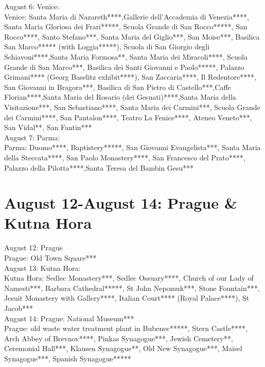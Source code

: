 August 6: Venice:\\

Venice: Santa Maria di Nazareth****,Gallerie dell'Accademia di Venezia****, Santa Maria Gloriosa dei Frari*****, Scuola Grande di San Rocco*****, San Rocco****, Santo Stefano***, Santa Maria del Giglio***, San Moise***, Basilica San Marco***** (with Loggia*****), 
Scuola di San Giorgio degli Schiavoni****,Santa Maria Formosa**, Santa Maria dei Miracoli****, Scuola Grande di San Marco***, Basilica dei Santi Giovanni e Paolo*****, Palazzo Grimani**** (Georg Baselitz exhibit****), San Zaccaria****, Il Redentore****, San Giovanni in Bragora***, 
Basilica di San Pietro di Castello***,Caffe Florian****,Santa Maria del Rosario (dei Gesuati)****,Santa Maria della Visitazione***, San Sebastiano****, Santa Maria dei Carmini***, Scuola Grande dei Carmini****, San Pantalon****, Teatro La Fenice****, Ateneo Veneto***, San Vidal**,
 San Fantin***\\

August 7: Parma:\\

Parma: Duomo****, Baptistery*****, San Giovanni Evangelista***, Santa Maria della Steccata****, San Paolo Monastery****, San Francesco del Prato****, Palazzo della Pilotta****,Santa Teresa del Bambin Gesu***\\

\section{August 12-August 14:  Prague \& Kutna Hora}
\label{2022:Prague}

August 12: Prague\\

Prague: Old Town Square***\\

August 13: Kutna Hora:\\

Kutna Hora: Sedlec Monastery***, Sedlec Ossuary****, Church of our Lady of Namesti***, Barbara Cathedral*****, St John Nepomuk***,  Stone Fountain***, Jesuit Monastery with Gallery****, Italian Court**** (Royal Palace****), St Jacob***\\

August 14: Prague: National Museum***\\

Prague: old waste water treatment plant in Bubenec*****, Stern Castle****, Arch Abbey of Brevnov****, Pinkas Synagogue***, Jewish Cemetery**, Ceremonial Hall***, Klausen Synagogue**, Old New Synagogue***, Maisel Synagogue***,
Spanish Synagogue*****\\

